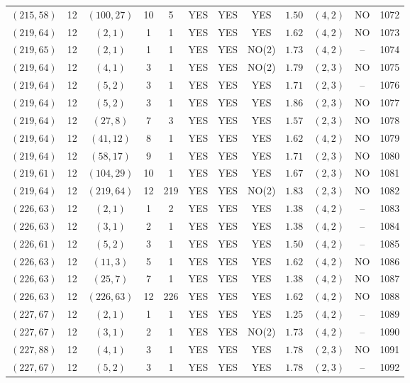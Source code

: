 \begin{longtable}{|c|c|c|c|c|c|c|c|c|c|c|c|}
$(215,58)$ & 12 & $(100,27)$ & 10 & 5 & YES & YES & YES & $1.50$ & $(4,2)$ & NO & 1072\\
$(219,64)$ & 12 & $(2,1)$ & 1 & 1 & YES & YES & YES & $1.62$ & $(4,2)$ & NO & 1073\\
$(219,65)$ & 12 & $(2,1)$ & 1 & 1 & YES & YES & NO(2) & $1.73$ & $(4,2)$ & -- & 1074\\
$(219,64)$ & 12 & $(4,1)$ & 3 & 1 & YES & YES & NO(2) & $1.79$ & $(2,3)$ & NO & 1075\\
$(219,64)$ & 12 & $(5,2)$ & 3 & 1 & YES & YES & YES & $1.71$ & $(2,3)$ & -- & 1076\\
$(219,64)$ & 12 & $(5,2)$ & 3 & 1 & YES & YES & YES & $1.86$ & $(2,3)$ & NO & 1077\\
$(219,64)$ & 12 & $(27,8)$ & 7 & 3 & YES & YES & YES & $1.57$ & $(2,3)$ & NO & 1078\\
$(219,64)$ & 12 & $(41,12)$ & 8 & 1 & YES & YES & YES & $1.62$ & $(4,2)$ & NO & 1079\\
$(219,64)$ & 12 & $(58,17)$ & 9 & 1 & YES & YES & YES & $1.71$ & $(2,3)$ & NO & 1080\\
$(219,61)$ & 12 & $(104,29)$ & 10 & 1 & YES & YES & YES & $1.67$ & $(2,3)$ & NO & 1081\\
$(219,64)$ & 12 & $(219,64)$ & 12 & 219 & YES & YES & NO(2) & $1.83$ & $(2,3)$ & NO & 1082\\
$(226,63)$ & 12 & $(2,1)$ & 1 & 2 & YES & YES & YES & $1.38$ & $(4,2)$ & -- & 1083\\
$(226,63)$ & 12 & $(3,1)$ & 2 & 1 & YES & YES & YES & $1.38$ & $(4,2)$ & -- & 1084\\
$(226,61)$ & 12 & $(5,2)$ & 3 & 1 & YES & YES & YES & $1.50$ & $(4,2)$ & -- & 1085\\
$(226,63)$ & 12 & $(11,3)$ & 5 & 1 & YES & YES & YES & $1.62$ & $(4,2)$ & NO & 1086\\
$(226,63)$ & 12 & $(25,7)$ & 7 & 1 & YES & YES & YES & $1.38$ & $(4,2)$ & NO & 1087\\
$(226,63)$ & 12 & $(226,63)$ & 12 & 226 & YES & YES & YES & $1.62$ & $(4,2)$ & NO & 1088\\
$(227,67)$ & 12 & $(2,1)$ & 1 & 1 & YES & YES & YES & $1.25$ & $(4,2)$ & -- & 1089\\
$(227,67)$ & 12 & $(3,1)$ & 2 & 1 & YES & YES & NO(2) & $1.73$ & $(4,2)$ & -- & 1090\\
$(227,88)$ & 12 & $(4,1)$ & 3 & 1 & YES & YES & YES & $1.78$ & $(2,3)$ & NO & 1091\\
$(227,67)$ & 12 & $(5,2)$ & 3 & 1 & YES & YES & YES & $1.78$ & $(2,3)$ & -- & 1092\\

\end{longtable}
